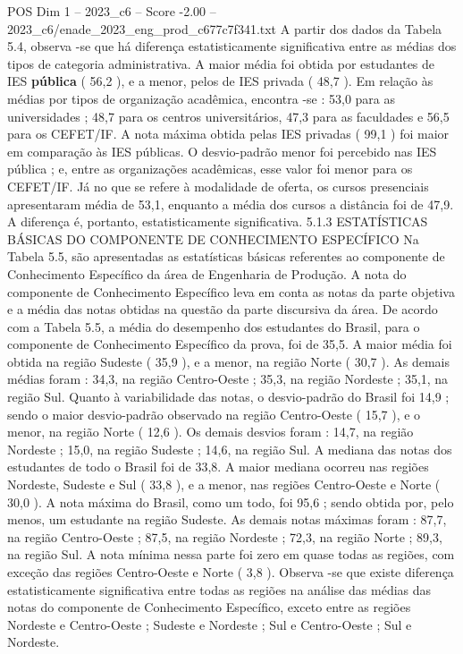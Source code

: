\begin{textsample}{POS Dim 1 – 2023\_c6 – Score -2.00 – 2023\_c6/enade\_2023\_eng\_prod\_c677c7f341.txt}
A partir dos dados da Tabela 5.4, observa -se que há diferença estatisticamente significativa entre as médias dos tipos de categoria administrativa.
A maior média foi obtida por estudantes de IES \textbf{pública} ( 56,2 ), e a menor, pelos de IES privada ( 48,7 ).
Em relação às médias por tipos de organização acadêmica, encontra -se : 53,0 para as universidades ; 48,7 para os centros universitários, 47,3 para as faculdades e 56,5 para os CEFET/IF.
A nota máxima obtida pelas IES privadas ( 99,1 ) foi maior em comparação às IES públicas.
O desvio-padrão menor foi percebido nas IES pública ; e, entre as organizações acadêmicas, esse valor foi menor para os CEFET/IF.
Já no que se refere à modalidade de oferta, os cursos presenciais apresentaram média de 53,1, enquanto a média dos cursos a distância foi de 47,9.
A diferença é, portanto, estatisticamente significativa. 5.1.3 ESTATÍSTICAS BÁSICAS DO COMPONENTE DE CONHECIMENTO ESPECÍFICO Na Tabela 5.5, são apresentadas as estatísticas básicas referentes ao componente de Conhecimento Específico da área de Engenharia de Produção.
A nota do componente de Conhecimento Específico leva em conta as notas da parte objetiva e a média das notas obtidas na questão da parte discursiva da área.
De acordo com a Tabela 5.5, a média do desempenho dos estudantes do Brasil, para o componente de Conhecimento Específico da prova, foi de 35,5.
A maior média foi obtida na região Sudeste ( 35,9 ), e a menor, na região Norte ( 30,7 ).
As demais médias foram : 34,3, na região Centro-Oeste ; 35,3, na região Nordeste ; 35,1, na região Sul.
Quanto à variabilidade das notas, o desvio-padrão do Brasil foi 14,9 ; sendo o maior desvio-padrão observado na região Centro-Oeste ( 15,7 ), e o menor, na região Norte ( 12,6 ).
Os demais desvios foram : 14,7, na região Nordeste ; 15,0, na região Sudeste ; 14,6, na região Sul.
A mediana das notas dos estudantes de todo o Brasil foi de 33,8.
A maior mediana ocorreu nas regiões Nordeste, Sudeste e Sul ( 33,8 ), e a menor, nas regiões Centro-Oeste e Norte ( 30,0 ).
A nota máxima do Brasil, como um todo, foi 95,6 ; sendo obtida por, pelo menos, um estudante na região Sudeste.
As demais notas máximas foram : 87,7, na região Centro-Oeste ; 87,5, na região Nordeste ; 72,3, na região Norte ; 89,3, na região Sul.
A nota mínima nessa parte foi zero em quase todas as regiões, com exceção das regiões Centro-Oeste e Norte ( 3,8 ).
Observa -se que existe diferença estatisticamente significativa entre todas as regiões na análise das médias das notas do componente de Conhecimento Específico, exceto entre as regiões Nordeste e Centro-Oeste ; Sudeste e Nordeste ; Sul e Centro-Oeste ; Sul e Nordeste.

\end{textsample}

